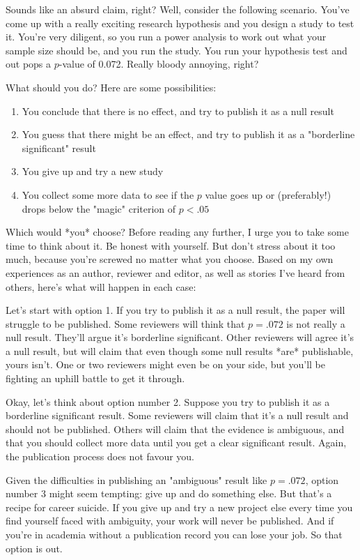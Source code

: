 Sounds like an absurd claim, right? Well, consider the following scenario. You've come up with a really exciting research hypothesis and you design a study to test it. You're very diligent, so you run a power analysis to work out what your sample size should be, and you run the study. You run your hypothesis test and out pops a $p$-value of 0.072. Really bloody annoying, right? 

What should you do? Here are some possibilities:

\begin{enumerate} \itemsep -2pt
\item You conclude that there is no effect, and try to publish it as a null result
\item You guess that there might be an effect, and try to publish it as a "borderline significant" result
\item You give up and try a new study
\item You collect some more data to see if the $p$ value goes up or (preferably!) drops below the "magic" criterion of $p<.05$
\end{enumerate}


Which would *you* choose? Before reading any further, I urge you to take some time to think about it. Be honest with yourself. But don't stress about it too much, because you're screwed no matter what you choose. Based on my own experiences as an author, reviewer and editor, as well as stories I've heard from others, here's what will happen in each case:


\item Let's start with option 1. If you try to publish it as a null result, the paper will struggle to be published. Some reviewers will think that $p=.072$ is not really a null result. They'll argue it's borderline significant. Other reviewers will agree it's a null result, but will claim that even though some null results *are* publishable, yours isn't. One or two reviewers might even be on your side, but you'll be fighting an uphill battle to get it through.

\item Okay, let's think about option number 2. Suppose you try to publish it as a borderline significant result. Some reviewers will claim that it's a null result and should not be published. Others will claim that the evidence is ambiguous, and that you should collect more data until you get a clear significant result. Again, the publication process does not favour you.

\item Given the difficulties in publishing an "ambiguous" result like $p=.072$, option number 3 might seem tempting: give up and do something else. But that's a recipe for career suicide. If you give up and try a new project else every time you find yourself faced with ambiguity, your work will never be published. And if you're in academia without a publication record you can lose your job. So that option is out.

